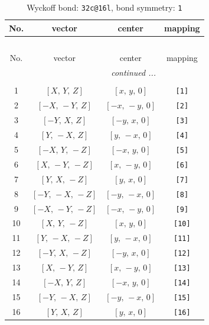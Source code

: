 \documentclass[fleqn,8pt]{jsarticle}
\begin{document}
\begin{longtable}{cccc}
\caption{Wyckoff bond: {\tt 32c@16l}, bond symmetry: {\tt 1}}
 \\
 \hline \hline
No. & vector & center & mapping \\ \hline \endfirsthead

\multicolumn{3}{l}{\tablename\ \thetable{}} \\
 \hline \hline
No. & vector & center & mapping \\ \hline \endhead

 \hline \hline
\multicolumn{3}{r}{\footnotesize\it continued ...} \\ \endfoot

 \hline \hline
\multicolumn{3}{r}{} \\ \endlastfoot

1 & $\left[ X,\, Y,\, Z \right]$ & $\left[ x,\, y,\, 0 \right]$ & {\tt [1]} \\ \hline
2 & $\left[ - X,\, - Y,\, Z \right]$ & $\left[ - x,\, - y,\, 0 \right]$ & {\tt [2]} \\ \hline
3 & $\left[ - Y,\, X,\, Z \right]$ & $\left[ - y,\, x,\, 0 \right]$ & {\tt [3]} \\ \hline
4 & $\left[ Y,\, - X,\, Z \right]$ & $\left[ y,\, - x,\, 0 \right]$ & {\tt [4]} \\ \hline
5 & $\left[ - X,\, Y,\, - Z \right]$ & $\left[ - x,\, y,\, 0 \right]$ & {\tt [5]} \\ \hline
6 & $\left[ X,\, - Y,\, - Z \right]$ & $\left[ x,\, - y,\, 0 \right]$ & {\tt [6]} \\ \hline
7 & $\left[ Y,\, X,\, - Z \right]$ & $\left[ y,\, x,\, 0 \right]$ & {\tt [7]} \\ \hline
8 & $\left[ - Y,\, - X,\, - Z \right]$ & $\left[ - y,\, - x,\, 0 \right]$ & {\tt [8]} \\ \hline
9 & $\left[ - X,\, - Y,\, - Z \right]$ & $\left[ - x,\, - y,\, 0 \right]$ & {\tt [9]} \\ \hline
10 & $\left[ X,\, Y,\, - Z \right]$ & $\left[ x,\, y,\, 0 \right]$ & {\tt [10]} \\ \hline
11 & $\left[ Y,\, - X,\, - Z \right]$ & $\left[ y,\, - x,\, 0 \right]$ & {\tt [11]} \\ \hline
12 & $\left[ - Y,\, X,\, - Z \right]$ & $\left[ - y,\, x,\, 0 \right]$ & {\tt [12]} \\ \hline
13 & $\left[ X,\, - Y,\, Z \right]$ & $\left[ x,\, - y,\, 0 \right]$ & {\tt [13]} \\ \hline
14 & $\left[ - X,\, Y,\, Z \right]$ & $\left[ - x,\, y,\, 0 \right]$ & {\tt [14]} \\ \hline
15 & $\left[ - Y,\, - X,\, Z \right]$ & $\left[ - y,\, - x,\, 0 \right]$ & {\tt [15]} \\ \hline
16 & $\left[ Y,\, X,\, Z \right]$ & $\left[ y,\, x,\, 0 \right]$ & {\tt [16]} \\
\end{longtable}
\end{document}
